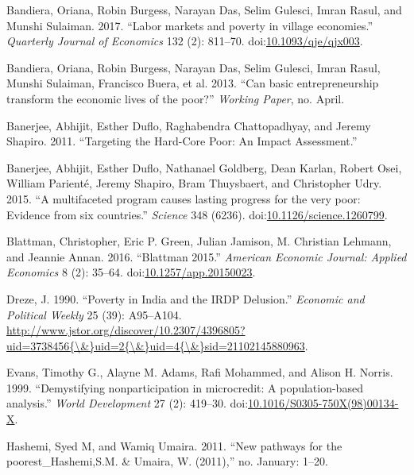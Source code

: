 \documentclass[]{article}
\begin{document}
\hypertarget{ref-Bandiera2017}{}
Bandiera, Oriana, Robin Burgess, Narayan Das, Selim Gulesci, Imran
Rasul, and Munshi Sulaiman. 2017. ``Labor markets and poverty in village
economies.'' \emph{Quarterly Journal of Economics} 132 (2): 811--70.
doi:\href{https://doi.org/10.1093/qje/qjx003}{10.1093/qje/qjx003}.

\hypertarget{ref-Bandiera2013}{}
Bandiera, Oriana, Robin Burgess, Narayan Das, Selim Gulesci, Imran
Rasul, Munshi Sulaiman, Francisco Buera, et al. 2013. ``Can basic
entrepreneurship transform the economic lives of the poor?''
\emph{Working Paper}, no. April.

\hypertarget{ref-Voropaeva1966}{}
Banerjee, Abhijit, Esther Duflo, Raghabendra Chattopadhyay, and Jeremy
Shapiro. 2011. ``Targeting the Hard-Core Poor: An Impact Assessment.''

\hypertarget{ref-Banerjee2015}{}
Banerjee, Abhijit, Esther Duflo, Nathanael Goldberg, Dean Karlan, Robert
Osei, William Parienté, Jeremy Shapiro, Bram Thuysbaert, and Christopher
Udry. 2015. ``A multifaceted program causes lasting progress for the
very poor: Evidence from six countries.'' \emph{Science} 348 (6236).
doi:\href{https://doi.org/10.1126/science.1260799}{10.1126/science.1260799}.

\hypertarget{ref-Blattman2016}{}
Blattman, Christopher, Eric P. Green, Julian Jamison, M. Christian
Lehmann, and Jeannie Annan. 2016. ``Blattman 2015.'' \emph{American
Economic Journal: Applied Economics} 8 (2): 35--64.
doi:\href{https://doi.org/10.1257/app.20150023}{10.1257/app.20150023}.

\hypertarget{ref-Dreze1990}{}
Dreze, J. 1990. ``Poverty in India and the IRDP Delusion.''
\emph{Economic and Political Weekly} 25 (39): A95--A104.
\href{http://www.jstor.org/discover/10.2307/4396805?uid=3738456\%7B/\&\%7Duid=2\%7B/\&\%7Duid=4\%7B/\&\%7Dsid=21102145880963}{http://www.jstor.org/discover/10.2307/4396805?uid=3738456\{\textbackslash{}\&\}uid=2\{\textbackslash{}\&\}uid=4\{\textbackslash{}\&\}sid=21102145880963}.

\hypertarget{ref-Evans1999}{}
Evans, Timothy G., Alayne M. Adams, Rafi Mohammed, and Alison H. Norris.
1999. ``Demystifying nonparticipation in microcredit: A population-based
analysis.'' \emph{World Development} 27 (2): 419--30.
doi:\href{https://doi.org/10.1016/S0305-750X(98)00134-X}{10.1016/S0305-750X(98)00134-X}.

\hypertarget{ref-Hashemi2011}{}
Hashemi, Syed M, and Wamiq Umaira. 2011. ``New pathways for the
poorest\_Hashemi,S.M. \& Umaira, W. (2011),'' no. January: 1--20.
\end{document}
